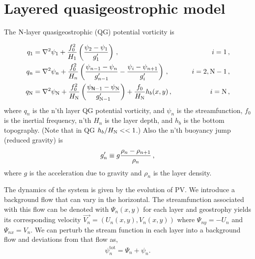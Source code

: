\documentclass[11pt]{article}
\newcommand{\tot}{\text{tot}}
\begin{document}


\section*{Layered quasigeostrophic model}

The $\mathrm{N}$-layer quasigeostrophic (QG) potential vorticity is

\begin{align}
{q_1} &= \nabla^2\psi_1 + \frac{f_0^2}{H_1} \left(\frac{\psi_{2}-\psi_1}{g'_{1}}\right)\,,  \qquad & i =1\, , \nonumber \\
{q_n} &= \nabla^2\psi_n + \frac{f_0^2}{H_n} \left(\frac{\psi_{n-1}-\psi_n}{g'_{n-1}}  - \frac{\psi_{i}-\psi_{n+1}}{g'_{i}}\right)\,,  \qquad &i = 2,\mathrm{N}-1 \, , \nonumber \\
{q_{\mathrm{N}}} &= \nabla^2\psi_{\mathrm{N}} + \frac{f_0^2}{H_{\mathrm{N}}} \left(\frac{\psi_{\textsf{N}-1}-\psi_{\mathrm{N}}}{g'_{\mathrm{N}-1}}\right) + \frac{f_0}{H_{\mathrm{N}}}h_b (x,y)\,,  \qquad & i =\mathrm{N}\,,
\end{align}
where $q_n$ is the n'th layer QG potential vorticity, and $\psi_n$ is the streamfunction, 
 $f_0$ is the inertial frequency, n'th $H_n$ is the layer depth, and $h_b$ is the 
bottom topography. (Note that in QG $h_b/H_{\mathrm{N}} << 1$.) Also the n'th buoyancy
jump (reduced gravity) is
\begin{equation}
g'_n \equiv g \frac{\rho_{n}-\rho_{n+1}}{\rho_n}\, ,
\end{equation}
where $g$ is the acceleration due to gravity and $\rho_n$ is the layer density.

The dynamics of the system is given by the evolution of PV. We introduce a background flow that can vary in the horizontal.  The streamfunction associated with this flow can be denoted with $\Psi_n(x,y)$ for each layer and geostrophy yields its corresponding velocity $\vec{V_n} = (U_n(x,y),V_n(x,y))$ where $\Psi_{ny} = - U_n$ and $\Psi_{nx} = V_n$.  We can perturb the stream function in each layer into a background flow and deviations from that flow as,
\begin{align}
\psi_n^{\tot} = \Psi_n + \psi_n.
\end{align}
\end{document}
